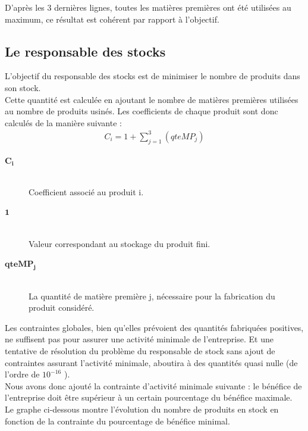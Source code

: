 \documentclass[12pt]{article}
\begin{document}
D'après les 3 dernières lignes, toutes les matières premières ont été utilisées au maximum, ce résultat est cohérent par rapport à l'objectif.
\subsection{Le responsable des stocks}
L'objectif du responsable des stocks est de minimiser le nombre de produits dans son stock. \\
Cette quantité est calculée en ajoutant le nombre de matières premières utilisées au nombre de produits usinés. Les coefficients de chaque produit sont donc calculés de la manière suivante : 
\begin{align*} C_{i} = 1 +  \sum_{j=1}^{3}(qteMP_{j}) 
\end{align*}
\begin{description}
\item[$\mathbf{C_{i}}$]\hfill\\Coefficient associé au produit i.
\item[$\mathbf{1}$]\hfill\\ Valeur correspondant au stockage du produit fini.
\item[$\mathbf{qteMP_{j}}$]\hfill\\La quantité de matière première j, nécessaire pour la fabrication du produit considéré.
\end{description}
Les contraintes globales, bien qu'elles prévoient des quantités fabriquées positives, ne suffisent pas pour assurer une activité minimale de l'entreprise. Et une tentative de résolution du problème du responsable de stock sans ajout de contraintes assurant l'activité minimale, aboutira à des quantités quasi nulle (de l'ordre de $ 10 ^{-16}$ ).\\
Nous avons donc ajouté la contrainte d'activité minimale suivante : le bénéfice de l'entreprise doit être supérieur à un certain pourcentage du bénéfice maximale.\\
Le graphe ci-dessous montre l'évolution du nombre de produits en stock en fonction de la contrainte du pourcentage de bénéfice minimal. 
\end{document}
